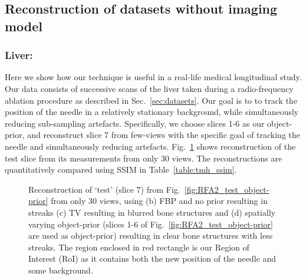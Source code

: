 \documentclass[journal]{IEEEtran}
\begin{document}
\subsection{Reconstruction of datasets without imaging model}
\subsubsection{\textbf{Liver:}}
\label{sec:tmh}

Here we show how our technique is useful in a
real-life medical longitudinal study. Our data consists of
successive scans of the liver taken during a radio-frequency ablation
procedure as described in Sec.~\ref{sec:datasets}. Our goal is to to
track the position of the needle in a relatively stationary
background, while simultaneously reducing sub-sampling artefacts.
Specifically, we choose slices 1-6 as our object-prior, and
reconstruct slice 7 from few-views with the specific goal of tracking
the needle and simultaneously reducing
artefacts. Fig.~\ref{fig:tmh_2D_results} 
shows reconstruction of the test
slice from its measurements from only 30 views. The reconstructions are quantitatively compared using
SSIM in Table~\ref{table:tmh_ssim}.

\begin{figure}[!h]
\centering
{}\hfill
{}\hfill
{}\hfill
{}
\caption{\small{ Reconstruction of `test' (slice 7) from Fig.~\ref{fig:RFA2_test_object-prior} from only 30 views, using (b) FBP and no prior resulting in streaks (c) TV resulting in blurred bone structures and (d) spatially varying object-prior (slices 1-6 of Fig.~\ref{fig:RFA2_test_object-prior} are used as object-prior) resulting in clear bone structures with less streaks. The region enclosed in red rectangle is our Region of Interest (RoI) as it contains both the new position of the needle and some background.}}
\label{fig:tmh_2D_results}
\end{figure}
\end{document}
